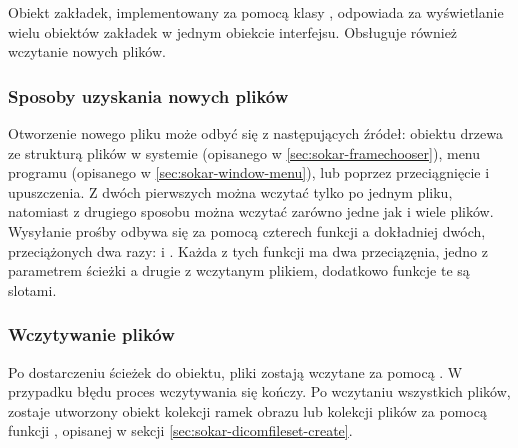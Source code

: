 \label{sec:sokar-dicomtabs}

\par
Obiekt zakładek, implementowany za pomocą klasy , odpowiada za wyświetlanie wielu obiektów zakładek w jednym obiekcie interfejsu.
Obsługuje również wczytanie nowych plików.

\subsubsection{Sposoby uzyskania nowych plików}

\par
Otworzenie nowego pliku może odbyć się z następujących źródeł: obiektu drzewa ze strukturą plików w systemie (opisanego w \ref{sec:sokar-framechooser}), menu programu (opisanego w \ref{sec:sokar-window-menu}), lub poprzez przeciągnięcie i upuszczenia.
Z dwóch pierwszych można wczytać tylko po jednym pliku, natomiast z drugiego sposobu można wczytać zarówno jedne jak i wiele plików.
Wysyłanie prośby odbywa się za pomocą czterech funkcji a dokładniej dwóch, przeciążonych dwa razy:  i .
Każda z tych funkcji ma dwa przeciązęnia, jedno z parametrem ścieżki a drugie z wczytanym plikiem, dodatkowo funkcje te są slotami.

\subsubsection{Wczytywanie plików}

\par
Po dostarczeniu ścieżek do obiektu, pliki zostają wczytane za pomocą .
W przypadku błędu proces wczytywania się kończy.
Po wczytaniu wszystkich plików, zostaje utworzony obiekt kolekcji ramek obrazu lub kolekcji plików \DICOM za pomocą funkcji , opisanej w sekcji \ref{sec:sokar-dicomfileset-create}.
